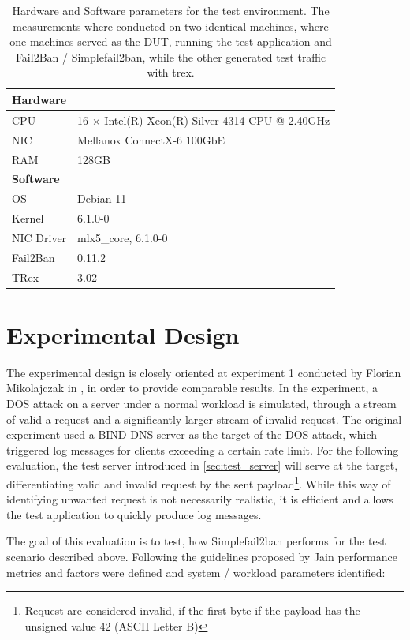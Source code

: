 \begin{table}[b!]
	\renewcommand{\arraystretch}{1.5}
	\caption[Testbed Summary]{Hardware and Software parameters for the test environment. The measurements where conducted
	on two identical machines, where one machines served as the \ac{DUT}, running the test application and Fail2Ban / Simplefail2ban,
	while the other generated test traffic with trex.}
	\label{tab:specs}
	 \centering
	\small
	\begin{tabular}{ll}
	\toprule
	\multicolumn{2}{l}{\textbf{Hardware}}                                        \\ \midrule
	CPU      & 16 $\times$ Intel(R) Xeon(R) Silver 4314 CPU @ 2.40GHz \\
	NIC      & Mellanox ConnectX-6 100GbE                       \\
	RAM        & 128GB                                                       \\ \bottomrule
	\multicolumn{2}{l}{\textbf{Software}}                                        \\ \midrule
	OS         & Debian 11                                                  \\
	Kernel          & 6.1.0-0                                                   \\
	NIC Driver & mlx5\_core, 6.1.0-0                                      \\
	Fail2Ban       & 0.11.2                                     \\
	TRex            & 3.02                                       \\ \bottomrule
	\end{tabular}
\end{table}

\section{Experimental Design}

The experimental design is closely oriented at experiment 1 conducted by Florian Mikolajczak in \cite{mikolajczak2022}, in order to provide comparable results.
In the experiment, a \ac{DOS} attack on a server under a normal workload is simulated, through a stream of valid a request and a significantly larger
stream of invalid request. The original experiment used a BIND DNS server as the target of the \ac{DOS} attack, which triggered log messages for clients exceeding a certain rate limit. For   
the following evaluation, the test server introduced in \ref{sec:test_server} will serve at the target, differentiating valid and invalid request by the sent payload\footnote{Request are considered invalid, if the first byte if the payload has the unsigned value 42 (ASCII Letter B)}.
While this way of identifying unwanted request is not necessarily realistic, it is efficient and allows the test application to quickly produce log messages.
\par
The goal of this evaluation is to test, how Simplefail2ban performs for the test scenario described above. 
Following the guidelines proposed by Jain \cite{jain:art} performance metrics and factors were defined and system / workload parameters identified:  


